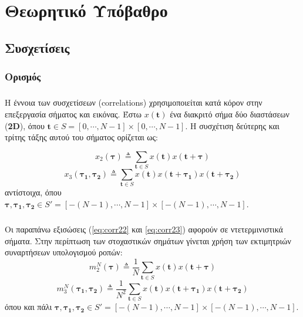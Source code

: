 \chapter{Θεωρητικό Υπόβαθρο} \label{chap:correlations}
\section{Συσχετίσεις}
\subsection{Ορισμός}
\paragraph*{}
Η έννοια των συσχετίσεων (correlations) χρησιμοποιείται κατά κόρον στην επεξεργασία σήματος και εικόνας. Έστω $x(\textbf{t})$ ένα διακριτό σήμα δύο διαστάσεων (\textbf{2D}), όπου $\boldsymbol{t}\in S = [0, \cdots ,N-1]\times[0, \cdots ,N-1]$. Η συσχέτιση δεύτερης και τρίτης τάξης αυτού του σήματος ορίζεται ως:

\begin{equation} \label{eq:corr22}
x_2(\boldsymbol{\tau})  \triangleq \sum\limits_{\boldsymbol{t}\in S}x(\boldsymbol{t})x(\boldsymbol{t}+\boldsymbol{\tau}) 
\end{equation}
\begin{equation} \label{eq:corr23}
x_3(\boldsymbol{\tau_1},\boldsymbol{\tau_2}) \triangleq \sum\limits_{\boldsymbol{t}\in S}x(\boldsymbol{t})x(\boldsymbol{t}+\boldsymbol{\tau_1}) x(\boldsymbol{t}+\boldsymbol{\tau_2}) 
\end{equation}
αντίστοιχα, όπου $\boldsymbol{\tau}, \boldsymbol{\tau_1}, \boldsymbol{\tau_2} \in S'=[-(N-1), \cdots ,N-1]\times[-(N-1), \cdots ,N-1]$.
\paragraph*{}
Οι παραπάνω εξισώσεις (\ref{eq:corr22} και \ref{eq:corr23}) αφορούν σε ντετερμινιστικά σήματα. Στην περίπτωση των στοχαστικών σημάτων γίνεται χρήση των εκτιμητριών συναρτήσεων υπολογισμού ροπών:
\begin{equation}
m_2^N(\boldsymbol{\tau}) \triangleq \dfrac{1}{N} \sum\limits_{\boldsymbol{t}\in S}x(\boldsymbol{t})x(\boldsymbol{t}+\boldsymbol{\tau})
\end{equation}
\begin{equation}
m_3^N(\boldsymbol{\tau_1},\boldsymbol{\tau_2}) \triangleq \dfrac{1}{N^2} \sum\limits_{\boldsymbol{t}\in S}x(\boldsymbol{t})x(\boldsymbol{t}+\boldsymbol{\tau_1}) x(\boldsymbol{t}+\boldsymbol{\tau_2})
\end{equation}
όπου και πάλι $\boldsymbol{\tau}, \boldsymbol{\tau_1}, \boldsymbol{\tau_2} \in S'=[-(N-1), \cdots ,N-1]\times[-(N-1), \cdots ,N-1]$.

